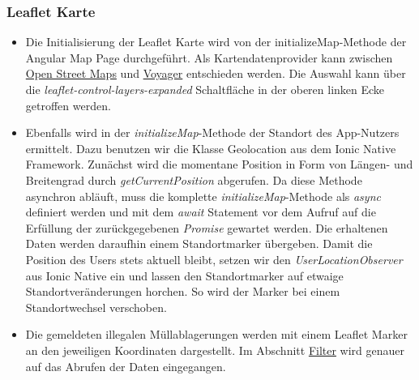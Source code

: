 \documentclass[a4paper, 11pt, DIV=11, listof=numbered, numbers=noenddot]{scrartcl}
\begin{document}
	\subsubsection{Leaflet Karte}
	\begin {itemize}
		\item Die Initialisierung der Leaflet Karte wird von der initializeMap-Methode der Angular Map Page durchgeführt. Als Kartendatenprovider kann zwischen \href{https://www.openstreetmap.org}{Open Street Maps} und \href{http://voyager.basemaps.cartocdn.com}				{Voyager} entschieden werden. Die Auswahl kann über die \textit{leaflet-control-layers-expanded} Schaltfläche in der oberen linken Ecke getroffen werden.
		\item Ebenfalls wird in der \textit{initializeMap}-Methode der Standort des App-Nutzers ermittelt. Dazu benutzen wir die Klasse Geolocation aus dem Ionic Native Framework. Zunächst wird die momentane Position in Form von Längen- und Breitengrad durch 					\textit{getCurrentPosition} abgerufen. Da diese Methode asynchron abläuft, muss die komplette \textit{initializeMap}-Methode als \textit{async} definiert werden und mit dem \textit{await} Statement vor dem Aufruf auf die Erfüllung der zurückgegebenen 				\textit{Promise} gewartet werden. Die erhaltenen Daten werden daraufhin einem Standortmarker übergeben.
			Damit die Position des Users stets aktuell bleibt, setzen wir den \textit{UserLocationObserver} aus Ionic Native ein und lassen den Standortmarker auf etwaige Standortveränderungen horchen. So wird der Marker bei einem Standortwechsel verschoben.
		\item Die gemeldeten illegalen Müllablagerungen werden mit einem Leaflet Marker an den jeweiligen Koordinaten dargestellt. Im Abschnitt \hyperref[sec:Filter] {Filter} wird genauer auf das Abrufen der Daten eingegangen.

	\end {itemize}
\end{document}
